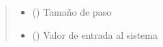 \documentclass[letterpaper,10pt,spanish]{sphinxmanual}
\begin{document}
\begin{fulllineitems}
\begin{quote}
\begin{description}
\begin{itemize}
\item {} 
 () \textendash{} Tamaño de paso

\item {} 
 () \textendash{} Valor de entrada al sistema

\end{itemize}

\end{description}\end{quote}

\end{fulllineitems}

\end{document}
